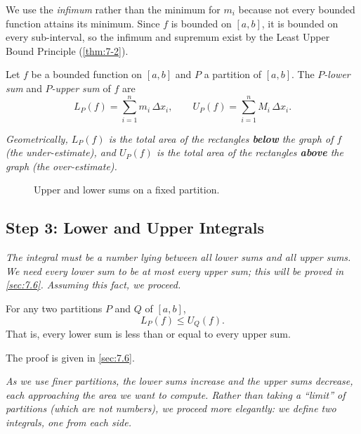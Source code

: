 \begin{remark}
We use the \emph{infimum} rather than the minimum for $m_i$ because not every bounded function attains its minimum.  Since $f$ is bounded on $[a,b]$, it is bounded on every sub-interval, so the infimum and supremum exist by the Least Upper Bound Principle (\cref{thm:7-2}).
\end{remark}

\begin{definition}
\label{def:7-9}
Let $f$ be a bounded function on $[a,b]$ and $P$ a partition of $[a,b]$.  The \emph{$P$-lower sum} and \emph{$P$-upper sum} of $f$ are
\[
  L_P(f) = \sum_{i=1}^{n} m_i\,\Delta x_i,
  \qquad
  U_P(f) = \sum_{i=1}^{n} M_i\,\Delta x_i.
\]
\end{definition}

\textit{Geometrically, $L_P(f)$ is the total area of the rectangles \textbf{below} the graph of $f$ (the under-estimate), and $U_P(f)$ is the total area of the rectangles \textbf{above} the graph (the over-estimate).}

\begin{figure}[ht]
  \centering
  
  \caption{Upper and lower sums on a fixed partition.}
  \label{fig:darboux-upper-lower}
\end{figure}

\subsection*{Step 3: Lower and Upper Integrals}

\textit{The integral must be a number lying between all lower sums and all upper sums.  We need every lower sum to be at most every upper sum; this will be proved in \cref{sec:7.6}.  Assuming this fact, we proceed.}

\begin{lemma}
\label{lem:7-1}
For any two partitions $P$ and $Q$ of $[a,b]$,
\[
  L_P(f) \le U_Q(f).
\]
That is, every lower sum is less than or equal to every upper sum.
\end{lemma}

The proof is given in \cref{sec:7.6}.

\textit{As we use finer partitions, the lower sums increase and the upper sums decrease, each approaching the area we want to compute.  Rather than taking a ``limit'' of partitions (which are not numbers), we proceed more elegantly: we define two integrals, one from each side.}

